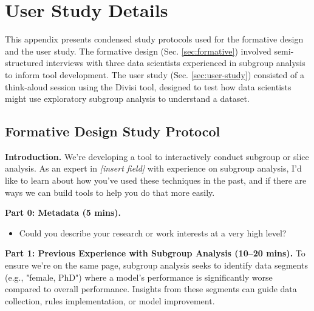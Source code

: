 \section{User Study Details}

This appendix presents condensed study protocols used for the formative design and the user study. The formative design (Sec. \ref{sec:formative}) involved semi-structured interviews with three data scientists experienced in subgroup analysis to inform tool development. The user study (Sec. \ref{sec:user-study}) consisted of a think-aloud session using the Divisi tool, designed to test how data scientists might use exploratory subgroup analysis to understand a dataset.

\subsection{Formative Design Study Protocol}
\label{app:formative-design}

\noindent \textbf{Introduction.} We’re developing a tool to interactively conduct subgroup or slice analysis. As an expert in \textit{[insert field]} with experience on subgroup analysis, I’d like to learn about how you’ve used these techniques in the past, and if there are ways we can build tools to help you do that more easily.

\noindent \textbf{Part 0: Metadata (5 mins).} 
\begin{itemize}
    \item Could you describe your research or work interests at a very high level?
\end{itemize}

\noindent \textbf{Part 1: Previous Experience with Subgroup Analysis (10–20 mins).}
To ensure we’re on the same page, subgroup analysis seeks to identify data segments (e.g., "female, PhD") where a model’s performance is significantly worse compared to overall performance. Insights from these segments can guide data collection, rules implementation, or model improvement.

